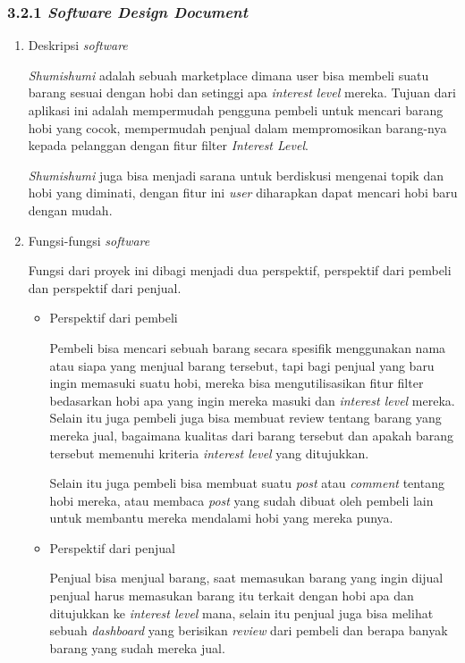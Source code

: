 \documentclass[a4paper]{article}
\begin{document}
\subsubsection*{3.2.1 \textit{Software Design Document}}
\begin{enumerate}[label=\alph*. ]
    \item Deskripsi \textit{software}

          \textit{Shumishumi} adalah sebuah marketplace dimana user bisa membeli suatu barang sesuai dengan hobi dan setinggi apa \textit{interest level} mereka. Tujuan dari aplikasi ini adalah mempermudah pengguna pembeli untuk mencari barang hobi yang cocok, mempermudah penjual dalam mempromosikan barang-nya kepada pelanggan dengan fitur filter \textit{Interest Level}.


          \textit{Shumishumi} juga bisa menjadi sarana untuk berdiskusi mengenai topik dan hobi yang diminati, dengan fitur ini \textit{user} diharapkan dapat mencari hobi baru dengan mudah.

    \item Fungsi-fungsi \textit{software}


          Fungsi dari proyek ini dibagi menjadi dua perspektif, perspektif dari pembeli dan perspektif dari penjual.
          \begin{itemize}
              \item Perspektif dari pembeli

                    Pembeli bisa mencari sebuah barang secara spesifik menggunakan nama atau siapa yang menjual barang tersebut, tapi bagi penjual yang baru ingin memasuki suatu hobi, mereka bisa mengutilisasikan fitur filter bedasarkan hobi apa yang ingin mereka masuki dan \textit{interest level} mereka. Selain itu juga pembeli juga bisa membuat review tentang barang yang mereka jual, bagaimana kualitas dari barang tersebut dan apakah barang tersebut memenuhi kriteria \textit{interest level} yang ditujukkan.

                    Selain itu juga pembeli bisa membuat suatu \textit{post} atau \textit{comment} tentang hobi mereka, atau membaca \textit{post} yang sudah dibuat oleh pembeli lain untuk membantu mereka mendalami hobi yang mereka punya.

              \item Perspektif dari penjual

                    Penjual bisa menjual barang, saat memasukan barang yang ingin dijual penjual harus memasukan barang itu terkait dengan hobi apa dan ditujukkan ke \textit{interest level} mana, selain itu penjual juga bisa melihat sebuah \textit{dashboard} yang berisikan \textit{review} dari pembeli dan berapa banyak barang yang sudah mereka jual.
          \end{itemize}


\end{enumerate}
\end{document}
